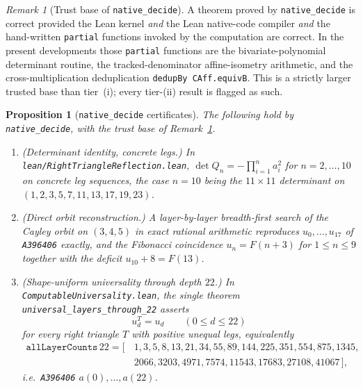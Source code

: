 \documentclass[11pt]{article}
\theoremstyle{plain}
\newtheorem{proposition}[theorem]{Proposition}
\theoremstyle{definition}
\theoremstyle{remark}
\newtheorem{remark}[theorem]{Remark}
\begin{document}
\begin{remark}[Trust base of \texttt{native\_decide}]
\label{rem:native-trust}
A theorem proved by \texttt{native\_decide} is correct provided the Lean
kernel \emph{and} the Lean native-code compiler \emph{and} the
hand-written \texttt{partial} functions invoked by the computation are
correct. In the present developments those \texttt{partial} functions
are the bivariate-polynomial determinant routine, the tracked-denominator
affine-isometry arithmetic, and the cross-multiplication deduplication
\texttt{dedupBy CAff.equivB}. This is a strictly larger trusted base than
tier~(i); every tier-(ii) result is flagged as such.
\end{remark}

\begin{proposition}[\texttt{native\_decide} certificates]
\label{prop:lean-native}
The following hold by \texttt{native\_decide}, with the trust base of
Remark~\ref{rem:native-trust}.
\begin{enumerate}
\item[\textup{(a)}] \emph{(Determinant identity, concrete legs.)} In
\texttt{lean/RightTriangleReflection.lean},
$\det Q_n = -\prod_{i=1}^n a_i^2$ for $n=2,\dots,10$ on concrete leg
sequences, the case $n=10$ being the $11\times 11$ determinant on
$(1,2,3,5,7,11,13,17,19,23)$.
\item[\textup{(b)}] \emph{(Direct orbit reconstruction.)} A
layer-by-layer breadth-first search of the Cayley orbit on $(3,4,5)$ in
exact rational arithmetic reproduces $u_0,\dots,u_{17}$ of
\texttt{A396406} exactly, and the Fibonacci coincidence
$u_n=F(n+3)$ for $1\le n\le 9$ together with the deficit
$u_{10}+8=F(13)$.
\item[\textup{(c)}] \emph{(Shape-uniform universality through depth
$22$.)} In \texttt{ComputableUniversality.lean}, the single theorem
\texttt{universal\_layers\_through\_22} asserts
\[
u_d^T = u_d \qquad (0 \le d \le 22)
\]
for \emph{every} right triangle $T$ with positive unequal legs,
equivalently
\begin{align*}
\mathtt{allLayerCounts}\,22 = [\,
&1,3,5,8,13,21,34,55,89,144,225,351,554,875,1345,\\
&2066,3203,4971,7574,11543,17683,27108,41067\,],
\end{align*}
i.e.\ \texttt{A396406} $a(0),\dots,a(22)$.
\end{enumerate}
\end{proposition}
\end{document}
